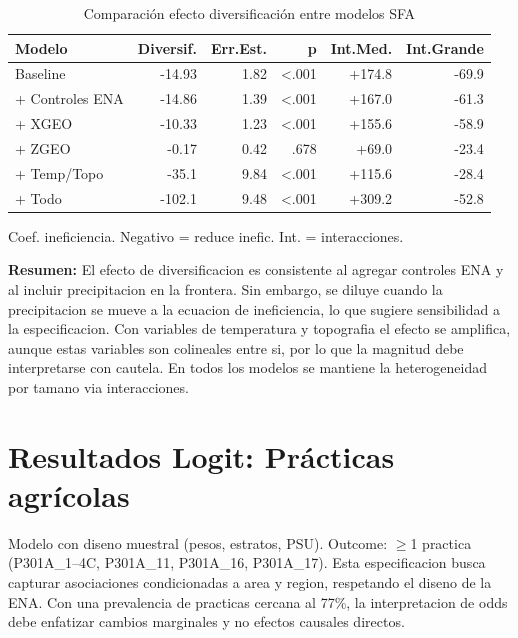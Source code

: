 \documentclass[10pt,a4paper]{article}
\begin{document}
\begin{table}[H]
\centering
\caption{Comparación efecto diversificación entre modelos SFA}
\label{tab:sfa_compare_all}
\begin{threeparttable}
\small
\begin{tabular}{lrrrrr}
\toprule
\textbf{Modelo} & \textbf{Diversif.} & \textbf{Err.Est.} & \textbf{p} & \textbf{Int.Med.} & \textbf{Int.Grande} \\
\midrule
Baseline & -14.93 & 1.82 & <.001 & +174.8 & -69.9 \\
+ Controles ENA & -14.86 & 1.39 & <.001 & +167.0 & -61.3 \\
+ XGEO & -10.33 & 1.23 & <.001 & +155.6 & -58.9 \\
+ ZGEO & -0.17 & 0.42 & .678 & +69.0 & -23.4 \\
+ Temp/Topo & -35.1 & 9.84 & <.001 & +115.6 & -28.4 \\
+ Todo & -102.1 & 9.48 & <.001 & +309.2 & -52.8 \\
\bottomrule
\end{tabular}
\begin{tablenotes}
\footnotesize
\item Coef. ineficiencia. Negativo = reduce inefic. Int. = interacciones.
\end{tablenotes}
\end{threeparttable}
\end{table}

\textbf{Resumen:} El efecto de diversificacion es consistente al agregar controles ENA y al incluir precipitacion en la frontera. Sin embargo, se diluye cuando la precipitacion se mueve a la ecuacion de ineficiencia, lo que sugiere sensibilidad a la especificacion. Con variables de temperatura y topografia el efecto se amplifica, aunque estas variables son colineales entre si, por lo que la magnitud debe interpretarse con cautela. En todos los modelos se mantiene la heterogeneidad por tamano via interacciones.

\section{Resultados Logit: Prácticas agrícolas}

Modelo con diseno muestral (pesos, estratos, PSU). Outcome: $\geq$1 practica (P301A\_1--4C, P301A\_11, P301A\_16, P301A\_17). Esta especificacion busca capturar asociaciones condicionadas a area y region, respetando el diseno de la ENA. Con una prevalencia de practicas cercana al 77\%, la interpretacion de odds debe enfatizar cambios marginales y no efectos causales directos.
\end{document}
